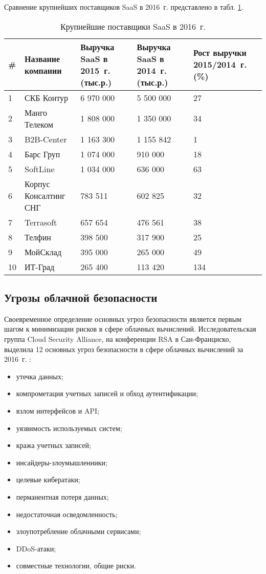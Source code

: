 Сравнение крупнейших поставщиков SaaS в 2016~г. \cite{cnews} представлено в табл. \ref{saas-table}.
\begin{table}[H]
  \caption{Крупнейшие поставщики SaaS в 2016~г.}\label{saas-table}
  \begin{tabular}{|p{0.5cm}|p{3.5cm}|p{3.5cm}|p{3.5cm}|p{3.5cm}|}
  \hline \# & Название компании & Выручка SaaS в 2015~г. (тыс.р.) & Выручка SaaS в 2014~г. (тыс.р.) & Рост выручки 2015/2014~г. (\%) \\
  \hline 1 & СКБ Контур & 6 970 000 & 5 500 000 & 27 \\
  \hline 2 & Манго Телеком & 1 808 000 & 1 350 000 & 34 \\
  \hline 3 & B2B-Center & 1 163 300 & 1 155 842 & 1 \\
  \hline 4 & Барс Груп & 1 074 000 & 910 000 & 18 \\
  \hline 5 & SoftLine & 1 034 000 & 636 000 & 63 \\
  \hline 6 & Корпус Консалтинг СНГ & 783 511 & 602 825 & 32 \\
  \hline 7 & Terrasoft & 657 654 & 476 561 & 38 \\
  \hline 8 & Телфин & 398 500 & 317 900 & 25 \\
  \hline 9 & МойСклад & 395 000 & 265 000 & 49 \\
  \hline 10 & ИТ-Град & 265 400 & 113 420 & 134 \\
  \hline
  \end{tabular}
\end{table}

\subsection{Угрозы облачной безопасности}

Своевременное определение основных угроз безопасности является первым шагом к минимизации рисков в сфере облачных вычислений.
Исследовательская группа Cloud Security Alliance, на конференции RSA в Сан-Франциско, выделила 12 основных угроз безопасности в сфере облачных вычислений за 2016~г. \cite{csa}:
\begin{itemize}
  \item утечка данных;
  \item компрометация учетных записей и обход аутентификации;
  \item взлом интерфейсов и API;
  \item уязвимость используемых систем;
  \item кража учетных записей;
  \item инсайдеры-злоумышленники;
  \item целевые кибератаки;
  \item перманентная потеря данных;
  \item недостаточная осведомленность;
  \item злоупотребление облачными сервисами;
  \item DDoS-атаки;
  \item совместные технологии, общие риски.
\end{itemize}

